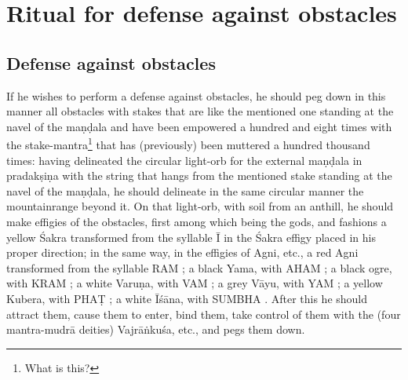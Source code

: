 \documentclass[11pt]{book}
\makeatletter
\def\fakesc#1{%
  \begingroup%
  \xdef\fake@name{\csname\curr@fontshape/\f@size\endcsname}%
  \fontsize{1.3\fontdimen8\fake@name}{\baselineskip}\selectfont%
  \uppercase{#1}%
  \endgroup%
}
\newcommand{\mantra}[1]{\fakesc{#1}}
\makeatother
\begin{document}
\section{Ritual for defense against obstacles}

\subsection{Defense against obstacles}
If he wishes to perform a defense against obstacles, he should peg down in this manner all obstacles with stakes that are like the mentioned one standing at the navel of the maṇḍala and have been empowered a hundred and eight times with the stake-mantra\footnote{What is this?} that has (previously) been muttered a hundred thousand times: having delineated the circular light-orb for the external maṇḍala in pradakṣiṇa with the string that hangs from the mentioned stake standing at the navel of the maṇḍala, he should delineate in the same circular manner the  mountainrange beyond it.
	On that light-orb, with soil from an anthill, he should make effigies of the obstacles, first among which being the gods, and fashions a yellow Śakra transformed from the syllable \mantra{ī} in the Śakra effigy placed in his proper direction; in the same way, in the effigies of Agni, etc., a red Agni transformed from the syllable \mantra{ram};
	a black Yama, with \mantra{aham};
	a black ogre, with \mantra{kram};
		a white Varuṇa, with \mantra{vam}; 	
		a grey Vāyu, with \mantra{yam};
			a yellow Kubera, with \mantra{phaṭ};
				a white Īśāna, with \mantra{sumbha}.
				After this he should attract them, cause them to enter, bind them, take control of them with the (four mantra-mudrā deities) Vajrāṅkuśa, etc., and pegs them down.
	
\end{document}
